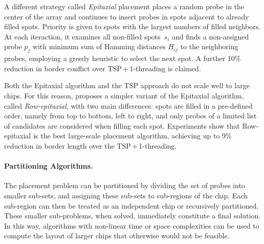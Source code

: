 \documentclass{llncs}
\newcommand{\ignore}[1]{}
\begin{document}
A different strategy called \emph{Epitaxial} placement
\cite{KAHNG02} places a random probe in the center of the array and continues
to insert probes in spots adjacent to already filled spots. Priority is given
to spots with the largest numbers of filled neighbors. At each iteraction, it
examines all non-filled spots~$s_i$ and finds a non-assigned probe $p_j$ with
minimum sum of Hamming distances $H_{ij}$ to the neighboring probes, employing
a greedy heuristic to select the next spot.  A further 10\% reduction in
border conflict over TSP\,+\,1-threading is claimed.

\ignore{
The major problem with the Epitaxial and the TSP-based algorithm is that they
have at least quadratic time complexity and thus are not scalable for the
latest million-probe microarrays. According to their experiments, the TSP
approach needed around 32 minutes to produce the layout of a 200\,x\,200
chip, whereas the Epitaxial algorithm needed 74 minutes on average. For a
500\,x\,500 chip, the TSP took over 30 hours to complete, whereas the
Epitaxial algorithm did not complete ``due to prohibitively large running
time or memory requirements'' \cite{KAHNG02}.
}

\ignore{
This observation has led to the development of two new algorithms by
\cite{KAHNG03A}. The first one, called Sliding-window Matching (SWM), is not
exactly a placement algorithm as it iteratively improves an initial placement
that can be constructed by, for instance, TSP and 1-threading. Improvements
are achieved by selecting an independent set of spots inside the window and
optimally replacing their probes using a minimum-weight perfect matching
algorithm. The term independent refers to probes that can be replaced without
affecting the border length of the other selected probes.
}

Both the Epitaxial algorithm and the TSP approach do not scale well to large
chips. For this reason, \cite{KAHNG03A} proposes a simpler variant of the
Epitaxial algorithm, called \emph{Row-epitaxial}, with two main differences:
spots are filled in a pre-defined order, namely from top to bottom, left to
right, and only probes of a limited list of candidates are considered when
filling each spot. Experiments show that Row-epitaxial is the best
large-scale placement algorithm, achieving up to 9\% reduction in border
length over the TSP\,+\,1-threading.


\paragraph{Partitioning Algorithms.}
The placement problem can be partitioned by dividing the set of probes into
smaller sub-sets, and assigning these sub-sets to sub-regions of the chip.
Each sub-region can then be treated as an independent chip or recursively
partitioned. These smaller sub-problems, when solved, immediately constitute a
final solution. In this way, algorithms with non-linear time or space
complexities can be used to compute the layout of larger chips that otherwise
would not be feasible.
\end{document}
